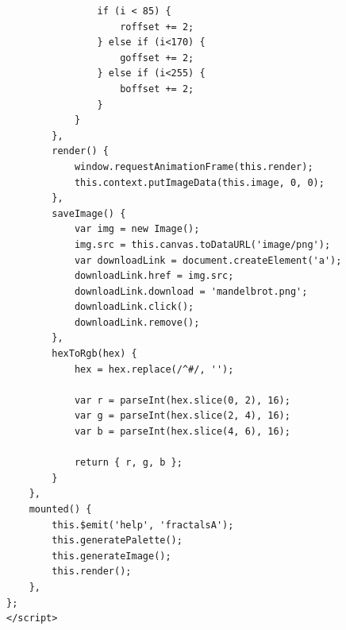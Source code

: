 \documentclass[oneside,14pt]{extarticle}
\begin{document}
\begin{normalsize}
\begin{tiny}
\begin{lstlisting}
				if (i < 85) {
					roffset += 2;
				} else if (i<170) {
					goffset += 2;
				} else if (i<255) {
					boffset += 2;
				}
			}
		},
		render() {
			window.requestAnimationFrame(this.render);
			this.context.putImageData(this.image, 0, 0);
		},
		saveImage() {
			var img = new Image();
			img.src = this.canvas.toDataURL('image/png');
			var downloadLink = document.createElement('a');
			downloadLink.href = img.src;
			downloadLink.download = 'mandelbrot.png';
			downloadLink.click();
			downloadLink.remove();
		},
		hexToRgb(hex) {
			hex = hex.replace(/^#/, '');
			
			var r = parseInt(hex.slice(0, 2), 16);
			var g = parseInt(hex.slice(2, 4), 16);
			var b = parseInt(hex.slice(4, 6), 16);
			
			return { r, g, b };
		}
	},
	mounted() {
		this.$emit('help', 'fractalsA');
		this.generatePalette();
		this.generateImage();
		this.render();
	},
};
</script>


\end{lstlisting}
\end{tiny}
\end{normalsize}
\end{document}
